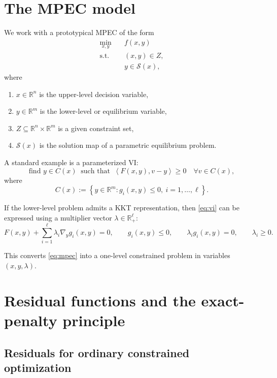 \documentclass[pdflatex,sn-mathphys-num]{sn-jnl}%
\theoremstyle{definition}
\newcommand{\R}{\mathbb{R}}
\newcommand{\cS}{\mathcal{S}}
\newcommand{\set}[1]{\left\{ #1 \right\}}
\newcommand{\ip}[2]{\left\langle #1,#2\right\rangle}
\begin{document}
\section{The MPEC model}
We work with a prototypical MPEC of the form
\begin{equation}
\label{eq:mpec}
\begin{aligned}
    \min_{x,y}\quad & f(x,y) \\
    \text{s.t.}\quad & (x,y)\in Z,\\
    & y \in \cS(x),
\end{aligned}
\end{equation}
where
\begin{enumerate}[label=(\roman*)]
    \item $x\in\R^n$ is the upper-level decision variable,
    \item $y\in\R^m$ is the lower-level or equilibrium variable,
    \item $Z\subseteq \R^n\times\R^m$ is a given constraint set,
    \item $\cS(x)$ is the solution map of a parametric equilibrium problem.
\end{enumerate}

A standard example is a parameterized VI:
\begin{equation}
\label{eq:vi}
\text{find } y\in C(x)\ \text{ such that }\ \ip{F(x,y)}{v-y}\ge 0\quad \forall v\in C(x),
\end{equation}
where
\[
C(x) := \set{y\in\R^m : g_i(x,y)\le 0,\ i=1,\dots,\ell }.
\]

If the lower-level problem admits a KKT representation, then \eqref{eq:vi} can be expressed using a multiplier vector $\lambda\in\R^\ell_+$:
\begin{equation}
\label{eq:kkt-vi}
F(x,y)+\sum_{i=1}^\ell \lambda_i \nabla_y g_i(x,y)=0,\qquad
g_i(x,y)\le 0,\qquad
\lambda_i g_i(x,y)=0,\qquad
\lambda_i\ge 0.
\end{equation}

This converts \eqref{eq:mpec} into a one-level constrained problem in variables $(x,y,\lambda)$.

\section{Residual functions and the exact-penalty principle}

\subsection{Residuals for ordinary constrained optimization}
\end{document}
